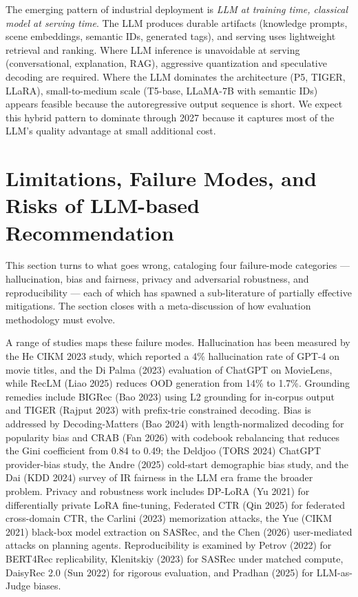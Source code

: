 The emerging pattern of industrial deployment is \emph{LLM at training time, classical model at serving time}. The LLM produces durable artifacts (knowledge prompts, scene embeddings, semantic IDs, generated tags), and serving uses lightweight retrieval and ranking. Where LLM inference is unavoidable at serving (conversational, explanation, RAG), aggressive quantization and speculative decoding are required. Where the LLM dominates the architecture (P5, TIGER, LLaRA), small-to-medium scale (T5-base, LLaMA-7B with semantic IDs) appears feasible because the autoregressive output sequence is short. We expect this hybrid pattern to dominate through 2027 because it captures most of the LLM's quality advantage at small additional cost.

\section{Limitations, Failure Modes, and Risks of LLM-based Recommendation}\label{limitations-failure-modes-and-risks-of-llm-based-recommendation}

This section turns to what goes wrong, cataloging four failure-mode categories --- hallucination, bias and fairness, privacy and adversarial robustness, and reproducibility --- each of which has spawned a sub-literature of partially effective mitigations. The section closes with a meta-discussion of how evaluation methodology must evolve.

A range of studies maps these failure modes. Hallucination has been measured by the He CIKM 2023 study, which reported a 4\% hallucination rate of GPT-4 on movie titles, and the Di Palma (2023) evaluation of ChatGPT on MovieLens, while RecLM (Liao 2025) reduces OOD generation from 14\% to 1.7\%. Grounding remedies include BIGRec (Bao 2023) using L2 grounding for in-corpus output and TIGER (Rajput 2023) with prefix-trie constrained decoding. Bias is addressed by Decoding-Matters (Bao 2024) with length-normalized decoding for popularity bias and CRAB (Fan 2026) with codebook rebalancing that reduces the Gini coefficient from 0.84 to 0.49; the Deldjoo (TORS 2024) ChatGPT provider-bias study, the Andre (2025) cold-start demographic bias study, and the Dai (KDD 2024) survey of IR fairness in the LLM era frame the broader problem. Privacy and robustness work includes DP-LoRA (Yu 2021) for differentially private LoRA fine-tuning, Federated CTR (Qin 2025) for federated cross-domain CTR, the Carlini (2023) memorization attacks, the Yue (CIKM 2021) black-box model extraction on SASRec, and the Chen (2026) user-mediated attacks on planning agents. Reproducibility is examined by Petrov (2022) for BERT4Rec replicability, Klenitskiy (2023) for SASRec under matched compute, DaisyRec 2.0 (Sun 2022) for rigorous evaluation, and Pradhan (2025) for LLM-as-Judge biases.

